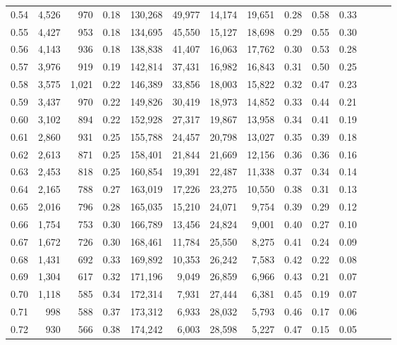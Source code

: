 \begin{tabular}{rrrrrrrrrrrrrr}
0.54 &  4,526 &    970 &  0.18 &  130,268 &   49,977 &  14,174 &  19,651 &  0.28 &  0.58 &      0.33 \\
0.55 &  4,427 &    953 &  0.18 &  134,695 &   45,550 &  15,127 &  18,698 &  0.29 &  0.55 &      0.30 \\
0.56 &  4,143 &    936 &  0.18 &  138,838 &   41,407 &  16,063 &  17,762 &  0.30 &  0.53 &      0.28 \\
0.57 &  3,976 &    919 &  0.19 &  142,814 &   37,431 &  16,982 &  16,843 &  0.31 &  0.50 &      0.25 \\
0.58 &  3,575 &  1,021 &  0.22 &  146,389 &   33,856 &  18,003 &  15,822 &  0.32 &  0.47 &      0.23 \\
0.59 &  3,437 &    970 &  0.22 &  149,826 &   30,419 &  18,973 &  14,852 &  0.33 &  0.44 &      0.21 \\
0.60 &  3,102 &    894 &  0.22 &  152,928 &   27,317 &  19,867 &  13,958 &  0.34 &  0.41 &      0.19 \\
0.61 &  2,860 &    931 &  0.25 &  155,788 &   24,457 &  20,798 &  13,027 &  0.35 &  0.39 &      0.18 \\
0.62 &  2,613 &    871 &  0.25 &  158,401 &   21,844 &  21,669 &  12,156 &  0.36 &  0.36 &      0.16 \\
0.63 &  2,453 &    818 &  0.25 &  160,854 &   19,391 &  22,487 &  11,338 &  0.37 &  0.34 &      0.14 \\
0.64 &  2,165 &    788 &  0.27 &  163,019 &   17,226 &  23,275 &  10,550 &  0.38 &  0.31 &      0.13 \\
0.65 &  2,016 &    796 &  0.28 &  165,035 &   15,210 &  24,071 &   9,754 &  0.39 &  0.29 &      0.12 \\
0.66 &  1,754 &    753 &  0.30 &  166,789 &   13,456 &  24,824 &   9,001 &  0.40 &  0.27 &      0.10 \\
0.67 &  1,672 &    726 &  0.30 &  168,461 &   11,784 &  25,550 &   8,275 &  0.41 &  0.24 &      0.09 \\
0.68 &  1,431 &    692 &  0.33 &  169,892 &   10,353 &  26,242 &   7,583 &  0.42 &  0.22 &      0.08 \\
0.69 &  1,304 &    617 &  0.32 &  171,196 &    9,049 &  26,859 &   6,966 &  0.43 &  0.21 &      0.07 \\
0.70 &  1,118 &    585 &  0.34 &  172,314 &    7,931 &  27,444 &   6,381 &  0.45 &  0.19 &      0.07 \\
0.71 &    998 &    588 &  0.37 &  173,312 &    6,933 &  28,032 &   5,793 &  0.46 &  0.17 &      0.06 \\
0.72 &    930 &    566 &  0.38 &  174,242 &    6,003 &  28,598 &   5,227 &  0.47 &  0.15 &      0.05 \\

\end{tabular}
